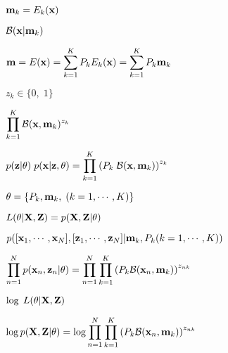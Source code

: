 \documentclass{article}
\def\lthtmlcheckvsize{\ifdim\ht\sizebox<\vsize 
  \ifdim\wd\sizebox<\hsize\expandafter\hfill\fi \expandafter\vfill
  \else\expandafter\vss\fi}%
\begin{document}
{\newpage\clearpage
{}%
$ {\bf m}_k=E_k({\bf x})$%
\lthtmlindisplaymathZ
\lthtmlcheckvsize\clearpage}

{\newpage\clearpage
{}%
$ {\cal B}({\bf x}|{\bf m}_k)$%
\lthtmlindisplaymathZ
\lthtmlcheckvsize\clearpage}

{\newpage\clearpage
{}%
$\displaystyle {\bf m}=E({\bf x})=\sum_{k=1}^KP_k E_k({\bf x})=\sum_{k=1}^K P_k{\bf m}_k$%
\lthtmlindisplaymathZ
\lthtmlcheckvsize\clearpage}

{\newpage\clearpage
{}%
$ z_k\in\{0,\;1\}$%
\lthtmlindisplaymathZ
\lthtmlcheckvsize\clearpage}

{\newpage\clearpage
{}%
$\displaystyle \prod_{k=1}^K {\cal B}({\bf x},{\bf m}_k)^{z_k}$%
\lthtmlindisplaymathZ
\lthtmlcheckvsize\clearpage}

{\newpage\clearpage
{}%
$\displaystyle p({\bf z}|{\bf\theta})\;p({\bf x}|{\bf z},{\bf\theta})
=\prod_{k=1}^K \left(P_k\;{\cal B}({\bf x},{\bf m}_k)\right)^{z_k}$%
\lthtmlindisplaymathZ
\lthtmlcheckvsize\clearpage}

{\newpage\clearpage
{}%
$ {\bf\theta}=\{P_k,{\bf m}_k,\;(k=1,\cdots,K)\}$%
\lthtmlindisplaymathZ
\lthtmlcheckvsize\clearpage}

{\newpage\clearpage
{}%
$\displaystyle L({\bf\theta}|{\bf X},{\bf Z})=p({\bf X},{\bf Z}|\theta)$%
\lthtmlindisplaymathZ
\lthtmlcheckvsize\clearpage}

{\newpage\clearpage
{}%
$\displaystyle p([{\bf x}_1,\cdots,{\bf x}_N],[{\bf z}_1,\cdots,{\bf z}_N]
|{\bf m}_k,P_k(k=1,\cdots,K))$%
\lthtmlindisplaymathZ
\lthtmlcheckvsize\clearpage}

{\newpage\clearpage
{}%
$\displaystyle \prod_{n=1}^N p({\bf x}_n,{\bf z}_n|{\bf\theta})
=\prod_{n=1}^N \prod_{k=1}^K \left(P_k{\cal B}({\bf x}_n,{\bf m}_k)\right)^{z_{nk}}$%
\lthtmlindisplaymathZ
\lthtmlcheckvsize\clearpage}

{\newpage\clearpage
{}%
$\displaystyle \log\;L({\bf\theta}|{\bf X},{\bf Z})$%
\lthtmlindisplaymathZ
\lthtmlcheckvsize\clearpage}

{\newpage\clearpage
{}%
$\displaystyle \log p({\bf X},{\bf Z}|\theta)
=\log\prod_{n=1}^N \prod_{k=1}^K \left(P_k{\cal B}({\bf x}_n,{\bf m}_k)\right)^{z_{nk}}$%
\lthtmlindisplaymathZ
\lthtmlcheckvsize\clearpage}
\end{document}
